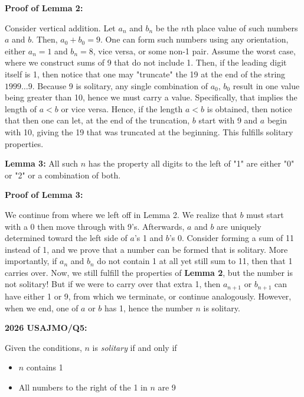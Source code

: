 \begin{enumerate}
 \textbf{Proof of Lemma 2:}

 Consider vertical addition. Let $a_n$ and $b_n$ be the $n$th place value of such numbers $a$ and $b$. Then, $a_0 + b_0 = 9$. One can form such numbers using any orientation, either $a_n = 1$ and $b_n = 8$, vice versa, or some non-1 pair. Assume the worst case, where we construct sums of 9 that do not include 1. Then, if the leading digit itself is 1, then notice that one may "truncate" the 19 at the end of the string $1999\dots 9$. Because 9 is solitary, any single combination of $a_0$, $b_0$ result in one value being greater than 10, hence we must carry a value. Specifically, that implies the length of $a < b$ or vice versa. Hence, if the length $a < b$ is obtained, then notice that then one can let, at the end of the truncation, $b$ start with 9 and $a$ begin with 10, giving the 19 that was truncated at the beginning. This fulfills solitary properties.

 \textbf{Lemma 3:} All such $n$ has the property all digits to the left of "1" are either "0" or "2" or a combination of both.

 \textbf{Proof of Lemma 3:}

 We continue from where we left off in Lemma 2. We realize that $b$ must start with a 0 then move through with 9's. Afterwards, $a$ and $b$ are uniquely determined toward the left side of $a$'s 1 and $b$'s 0. Consider forming a sum of 11 instead of 1, and we prove that a number can be formed that is solitary. More importantly, if $a_n$ and $b_n$ do not contain 1 at all yet still sum to 11, then that 1 carries over. Now, we still fulfill the properties of \textbf{Lemma 2}, but the number is not solitary! But if we were to carry over that extra 1, then $a_{n+1}$ or $b_{n+1}$ can have either 1 or 9, from which we terminate, or continue analogously. However, when we end, one of $a$ or $b$ has 1, hence the number $n$ is solitary.

 \textbf{2026 USAJMO/Q5:}

 Given the conditions, $n$ is \textit{solitary} if and only if

 
            \begin{itemize}
        \item $n$ contains 1
            \end{itemize}
            
            \begin{itemize}
        \item All numbers to the right of the 1 in $n$ are 9
            \end{itemize}
            

\end{enumerate}
